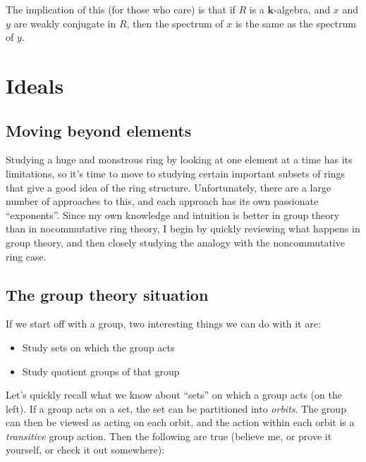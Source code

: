 \documentclass[a4paper]{amsart}
\newcommand{\field}{\mathbf{k}}
\begin{document}
The implication of this (for those who care) is that if $R$ is a
$\field$-algebra, and $x$ and $y$ are weakly conjugate in $R$, then
the spectrum of $x$ is the same as the spectrum of $y$.

\section{Ideals}

\subsection{Moving beyond elements}

Studying a huge and monstrous ring by looking at one element at a time
has its limitations, so it's time to move to studying certain
important subsets of rings that give a good idea of the ring
structure.  Unfortunately, there are a large number of approaches to
this, and each approach has its own passionate ``exponents''. Since my
own knowledge and intuition is better in group theory than in
nocommutative ring theory, I begin by quickly reviewing what happens
in group theory, and then closely studying the analogy with the
noncommutative ring case.

\subsection{The group theory situation}

If we start off with a group, two interesting things we can do with it are:

\begin{itemize}

\item Study sets on which the group acts

\item Study quotient groups of that group

\end{itemize}

Let's quickly recall what we know about ``sets'' on which a group acts
(on the left). If a group acts on a set, the set can be partitioned
into {\em orbits}.  The group can then be viewed as acting on each
orbit, and the action within each orbit is a {\em transitive} group
action. Then the following are true (believe me, or prove it yourself,
or check it out somewhere):
\end{document}
